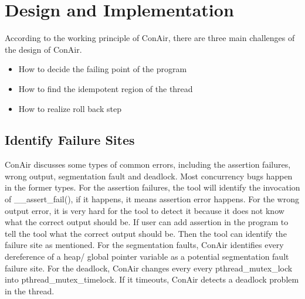 \section{Design and Implementation}
\label{chp:Design}
According to the working principle of ConAir, there are three main challenges of the design of ConAir.
\begin{itemize}
\item
How to decide the failing point of the program
\item
How to find the idempotent region of the thread
\item
How to realize roll back step
\end{itemize}
\subsection{Identify Failure Sites}
ConAir discusses some types of common errors, including the assertion failures,
wrong output, segmentation fault and deadlock. Most concurrency bugs happen in
the former types. For the assertion failures, the tool will identify the
invocation of \_\_assert\_fail(), if it happens, it means assertion error
happens. For the wrong output error, it is very hard for the tool to detect it
because it does not know what the correct output should be. If user can add
assertion in the program to tell the tool what the correct output should be.
Then the tool can identify the failure site as mentioned. For the segmentation
faults, ConAir identifies every dereference of a heap/ global pointer variable
as a  potential segmentation fault failure site. For the deadlock, ConAir
changes every every pthread\_mutex\_lock into pthread\_mutex\_timelock. If it
timeouts, ConAir detects a deadlock problem in the thread.

